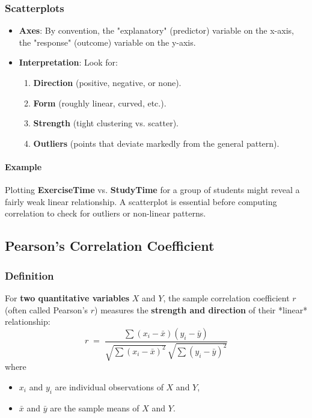 \documentclass[10pt, total={6in, 8in}]{extarticle}
\begin{document}
\subsubsection*{Scatterplots}

\begin{itemize}
    \item \textbf{Axes}: By convention, the "explanatory" (predictor) variable on the x-axis, the "response" (outcome) variable on the y-axis.
    \item \textbf{Interpretation}: Look for:
          \begin{enumerate}
              \item \textbf{Direction} (positive, negative, or none).
              \item \textbf{Form} (roughly linear, curved, etc.).
              \item \textbf{Strength} (tight clustering vs. scatter).
              \item \textbf{Outliers} (points that deviate markedly from the general pattern).
          \end{enumerate}
\end{itemize}

\paragraph{Example} Plotting \textbf{ExerciseTime} vs. \textbf{StudyTime} for a group of students might reveal a fairly weak linear relationship. A scatterplot is essential before computing correlation to check for outliers or non-linear patterns.


\subsection{Pearson's Correlation Coefficient}

\subsubsection{Definition}

For \textbf{two quantitative variables} $X$ and $Y$, the sample correlation coefficient $r$ (often called Pearson's $r$) measures the \textbf{strength and direction} of their *linear* relationship:
\[
    r \;=\; \frac{\sum (x_i - \bar{x})(y_i - \bar{y})}
    {\sqrt{\sum (x_i - \bar{x})^2}\,\sqrt{\sum (y_i - \bar{y})^2}}
\]
where
\begin{itemize}
    \item $x_i$ and $y_i$ are individual observations of $X$ and $Y$,
    \item $\bar{x}$ and $\bar{y}$ are the sample means of $X$ and $Y$.
\end{itemize}
\end{document}
